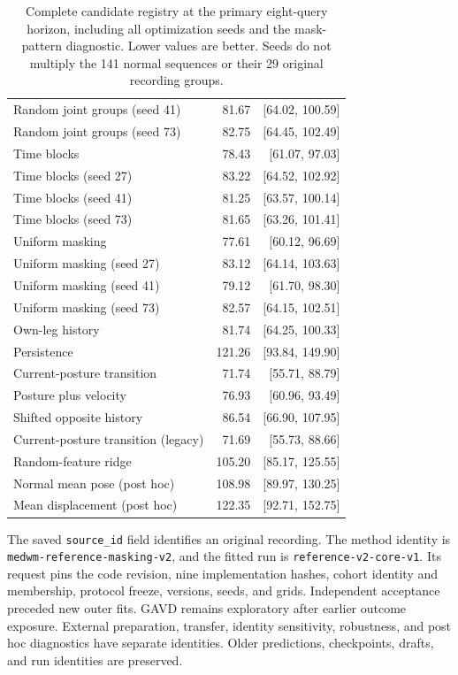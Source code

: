\documentclass[letterpaper]{article}
\begin{document}
\begin{table}[t]
\begin{tabular}{lrr}
Random joint groups (seed 41) & 81.67 & [64.02, 100.59] \\
Random joint groups (seed 73) & 82.75 & [64.45, 102.49] \\
Time blocks & 78.43 & [61.07, 97.03] \\
Time blocks (seed 27) & 83.22 & [64.52, 102.92] \\
Time blocks (seed 41) & 81.25 & [63.57, 100.14] \\
Time blocks (seed 73) & 81.65 & [63.26, 101.41] \\
Uniform masking & 77.61 & [60.12, 96.69] \\
Uniform masking (seed 27) & 83.12 & [64.14, 103.63] \\
Uniform masking (seed 41) & 79.12 & [61.70, 98.30] \\
Uniform masking (seed 73) & 82.57 & [64.15, 102.51] \\
Own-leg history & 81.74 & [64.25, 100.33] \\
Persistence & 121.26 & [93.84, 149.90] \\
Current-posture transition & 71.74 & [55.71, 88.79] \\
Posture plus velocity & 76.93 & [60.96, 93.49] \\
Shifted opposite history & 86.54 & [66.90, 107.95] \\
Current-posture transition (legacy) & 71.69 & [55.73, 88.66] \\
Random-feature ridge & 105.20 & [85.17, 125.55] \\
Normal mean pose (post hoc) & 108.98 & [89.97, 130.25] \\
Mean displacement (post hoc) & 122.35 & [92.71, 152.75] \\
\bottomrule
\end{tabular}
\caption{Complete candidate registry at the primary eight-query horizon, including all optimization seeds and the mask-pattern diagnostic. Lower values are better. Seeds do not multiply the 141 normal sequences or their 29 original recording groups.}
\label{tab:complete_forecasts}
\end{table}

The saved \texttt{source\_id} field identifies an original recording. The method identity is \texttt{medwm-reference-masking-v2}, and the fitted run is \texttt{reference-v2-core-v1}. Its request pins the code revision, nine implementation hashes, cohort identity and membership, protocol freeze, versions, seeds, and grids. Independent acceptance preceded new outer fits. GAVD remains exploratory after earlier outcome exposure. External preparation, transfer, identity sensitivity, robustness, and post hoc diagnostics have separate identities. Older predictions, checkpoints, drafts, and run identities are preserved.
\end{document}
